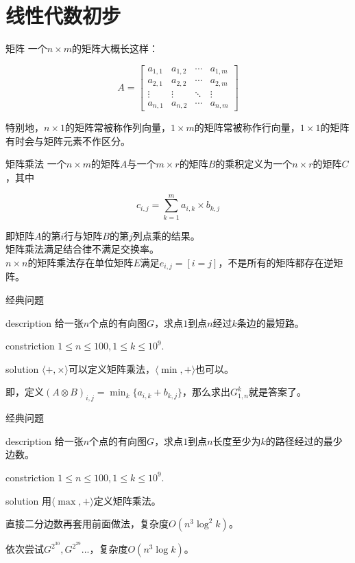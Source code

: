 \documentclass{beamer}
\begin{document}
	\section{线性代数初步}
	\begin{frame}{矩阵}
		一个$n\times m$的矩阵大概长这样：
		
		$$A=\begin{bmatrix}
		a_{1,1} & a_{1,2} & \cdots & a_{1,m}\\
		a_{2,1} & a_{2,2} & \cdots & a_{2,m}\\
		\vdots  & \vdots  & \ddots & \vdots \\
		a_{n,1} & a_{n,2} & \cdots & a_{n,m}
		\end{bmatrix}$$
		
		特别地，$n \times 1$的矩阵常被称作列向量，$1 \times m$的矩阵常被称作行向量，$1 \times 1$的矩阵有时会与矩阵元素不作区分。
	\end{frame}
	\begin{frame}{矩阵乘法}
		一个$n \times m$的矩阵$A$与一个$m \times r$的矩阵$B$的乘积定义为一个$n \times r$的矩阵$C$，其中
		
		$$c_{i,j}=\sum_{k=1}^ma_{i,k}\times b_{k,j}$$
		
		即矩阵$A$的第$i$行与矩阵$B$的第$j$列点乘的结果。\\
		
		矩阵乘法满足结合律不满足交换率。\\
		
		$n \times n$的矩阵乘法存在单位矩阵$E$满足$e_{i,j}=[i=j]$，不是所有的矩阵都存在逆矩阵。
	\end{frame}
	\begin{frame}{经典问题}
		\begin{block}{description}
			给一张$n$个点的有向图$G$，求点$1$到点$n$经过$k$条边的最短路。
		\end{block}
		\begin{block}{constriction}
			$1 \le n \le 100, 1 \le k \le 10^9.$
		\end{block}
		\pause
		\begin{block}{solution}
			$\langle+,\times \rangle$可以定义矩阵乘法，$\langle\min,+\rangle$也可以。
			
			即，定义$(A \otimes B)_{i,j}=\min_k\{a_{i,k}+b_{k,j}\}$，那么求出$G^k_{1,n}$就是答案了。
		\end{block}
	\end{frame}
	\begin{frame}{经典问题}
		\begin{block}{description}
			给一张$n$个点的有向图$G$，求点$1$到点$n$长度至少为$k$的路径经过的最少边数。
		\end{block}
		\begin{block}{constriction}
			$1 \le n \le 100, 1 \le k \le 10^9.$
		\end{block}
		\pause
		\begin{block}{solution}
			用$\langle\max,+\rangle$定义矩阵乘法。
			
			直接二分边数再套用前面做法，复杂度$O(n^3\log^2k)$。
			
			依次尝试$G^{2^{30}},G^{2^{29}}...$，复杂度$O(n^3\log k)$。
		\end{block}
	\end{frame}
\end{document}

